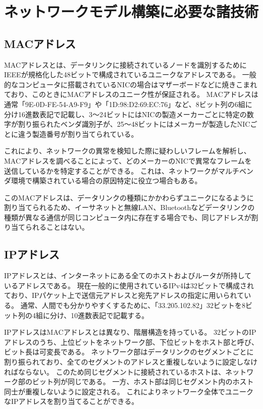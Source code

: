 \section{ネットワークモデル構築に必要な諸技術}

\subsection{MACアドレス}

MACアドレスとは、データリンクに接続されているノードを識別するためにIEEEが規格化した48ビットで構成されているユニークなアドレスである\cite{masteringtcpip}。
一般的なコンピュータに搭載されているNICの場合はマザーボードなどに焼きこまれており、このときにMACアドレスのユニーク性が保証される。
MACアドレスは通常「9E-0D-FE-54-A9-F9」や「1D:98:D2:69:EC:76」など、8ビット列の6組に分け16進数表記で記載し、3～24ビットにはNICの製造メーカーごとに特定の数字が割り振られたベンダ識別子が、25～48ビットにはメーカーが製造したNICごとに違う製造番号が割り当てられている。

これにより、ネットワークの異常を検知した際に疑わしいフレームを解析し、MACアドレスを調べることによって、どのメーカーのNICで異常なフレームを送信しているかを特定することができる。
これは、ネットワークがマルチベンダ環境で構築されている場合の原因特定に役立つ場合もある。

このMACアドレスは、データリンクの種類にかかわらずユニークになるように割り当てられるため、イーサネットと無線LAN、Bluetoothなどデータリンクの種類が異なる通信が同じコンピュータ内に存在する場合でも、同じアドレスが割り当てられることはない。

\subsection{IPアドレス}

IPアドレスとは、インターネットにある全てのホストおよびルータが所持しているアドレスである\cite{tanenbaum}。
現在一般的に使用されているIPv4は32ビットで構成されており、IPパケット上で送信元アドレスと宛先アドレスの指定に用いられている。
通常、人間でも分かりやすくするために、「33.205.102.82」32ビットを8ビット列の4組に分け、10進数表記で記載する。

IPアドレスはMACアドレスとは異なり、階層構造を持っている\cite{masteringtcpip}。
32ビットのIPアドレスのうち、上位ビットをネットワーク部、下位ビットをホスト部と呼び、ビット長は可変長である。
ネットワーク部はデータリンクのセグメントごとに割り振られており、全てのセグメントのアドレスと重複しないように設定しなければならない。
このため同じセグメントに接続されているホストは、ネットワーク部のビット列が同じである。
一方、ホスト部は同じセグメント内のホスト同士が重複しないように設定される。
これによりネットワーク全体でユニークなIPアドレスを割り当てることができる。

